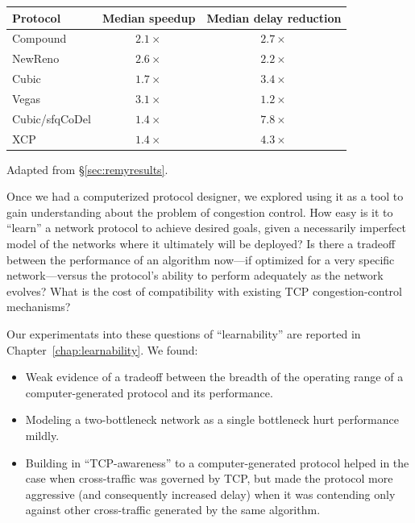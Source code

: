 \begin{center}

\begin{tabular}{|l|c|c|}
\hline
Protocol & Median speedup & Median delay reduction \\
\hline
\hline
Compound & $2.1\times$ & $2.7\times$ \\
NewReno & $2.6\times$ & $2.2\times$ \\
Cubic & $1.7\times$ & $3.4\times$ \\
Vegas & $3.1\times$ & $1.2\times$ \\
\hline
Cubic/sfqCoDel & $1.4\times$ & $7.8\times$ \\
XCP & $1.4\times$ & $4.3\times$ \\
\hline
\end{tabular}

{\footnotesize Adapted from \S\ref{sec:remyresults}.}

\end{center}

Once we had a computerized protocol designer, we explored using it as
a tool to gain understanding about the problem of congestion control.
How easy is it to ``learn'' a network protocol to achieve desired
goals, given a necessarily imperfect model of the networks where it
ultimately will be deployed? Is there a tradeoff between the
performance of an algorithm now---if optimized for a very specific
network---versus the protocol's ability to perform adequately as the
network evolves? What is the cost of compatibility with existing TCP
congestion-control mechanisms?

Our experimentats into these questions of ``learnability'' are reported
in Chapter~\ref{chap:learnability}. We found:

\begin{itemize}

\item Weak evidence of a tradeoff between the breadth of the operating
  range of a computer-generated protocol and its performance.

\item Modeling a two-bottleneck network as a single bottleneck hurt
  performance mildly.

\item Building in ``TCP-awareness'' to a computer-generated protocol
  helped in the case when cross-traffic was governed by TCP, but made
  the protocol more aggressive (and consequently increased delay) when
  it was contending only against other cross-traffic generated by the
  same algorithm.

\end{itemize}
